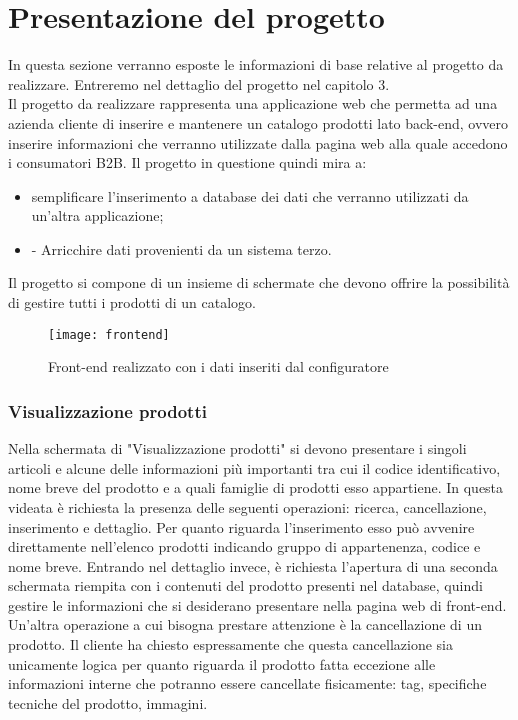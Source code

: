 \section{Presentazione del progetto}
In questa sezione verranno esposte le informazioni di base relative al progetto da realizzare. Entreremo nel dettaglio del progetto nel capitolo 3.
\\
Il progetto da realizzare rappresenta una applicazione web che permetta ad una azienda cliente di inserire e mantenere un catalogo prodotti lato back-end, ovvero inserire informazioni che verranno utilizzate dalla pagina web alla quale accedono i consumatori B2B. 
Il progetto in questione quindi mira a:
\begin{itemize}
	\item  semplificare l'inserimento a database dei dati che verranno utilizzati da un'altra applicazione;
	\item -	Arricchire dati provenienti da un sistema terzo.
\end{itemize}

Il progetto si compone di un insieme di schermate che devono offrire la possibilità di gestire tutti i prodotti di un catalogo. 


\begin{figure}[!h] 
	\centering 
	\texttt{[image: frontend]} 
	\caption{Front-end realizzato con i dati inseriti dal configuratore}
	\label{ImgFrontend}
\end{figure}

\subsubsection{Visualizzazione prodotti}
Nella schermata di "Visualizzazione prodotti" si devono presentare i singoli articoli e alcune delle informazioni più importanti tra cui il codice identificativo, nome breve del prodotto e a quali famiglie di prodotti esso appartiene. In questa videata è richiesta la presenza delle seguenti operazioni: ricerca, cancellazione, inserimento e dettaglio.
Per quanto riguarda l'inserimento esso può avvenire direttamente nell'elenco prodotti indicando gruppo di appartenenza, codice e nome breve.
Entrando nel dettaglio invece, è richiesta l'apertura di una seconda schermata riempita con i contenuti del prodotto presenti nel database, quindi gestire le informazioni che si desiderano presentare nella pagina web di front-end.
Un'altra operazione a cui bisogna prestare attenzione è la cancellazione di un prodotto. Il cliente ha chiesto espressamente che questa cancellazione sia unicamente logica per quanto riguarda il prodotto fatta eccezione alle informazioni interne che potranno essere cancellate fisicamente: tag, specifiche tecniche del prodotto, immagini.

